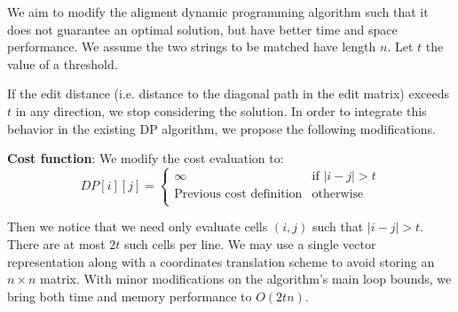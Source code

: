 
We aim to modify the aligment dynamic programming algorithm such that it does not guarantee an optimal solution, but have better time and space performance. We assume the two strings to be matched have length $n$. Let $t$ the value of a threshold.

If the edit distance (i.e. distance to the diagonal path in the edit matrix) exceeds $t$ in any direction, we stop considering the solution. In order to integrate this behavior in the existing DP algorithm, we propose the following modifications.

\textbf{Cost function}: We modify the cost evaluation to:
\[
  DP[i][j] = \left \{
    \begin{array}{ll}
      \infty & \text{if } |i - j| > t \\
      \text{Previous cost definition} & \text{otherwise} \\
    \end{array}
  \right.
\]

Then we notice that we need only evaluate cells $(i, j)$ such that $|i - j| > t$. There are at most $2t$ such cells per line. We may use a single vector representation along with a coordinates translation scheme to avoid storing an $n \times n$ matrix. With minor modifications on the algorithm's main loop bounds, we bring both time and memory performance to $O(2tn)$.
